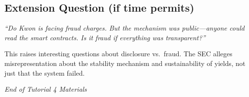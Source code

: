 \documentclass[11pt]{article}
\begin{document}
\subsection*{Extension Question (if time permits)}

\textit{``Do Kwon is facing fraud charges. But the mechanism was public---anyone could read the smart contracts. Is it fraud if everything was transparent?''}

\medskip
This raises interesting questions about disclosure vs.\ fraud. The SEC alleges misrepresentation about the stability mechanism and sustainability of yields, not just that the system failed.

\vfill
\begin{flushright}
\textit{End of Tutorial 4 Materials}
\end{flushright}
\end{document}
